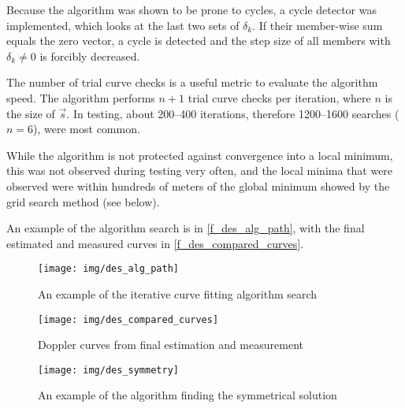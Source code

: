 Because the algorithm was shown to be prone to cycles, a cycle detector was implemented, which looks at the last two sets of $\delta_k$. If their member-wise sum equals the zero vector, a cycle is detected and the step size of all members with $\delta_k \not= 0$ is forcibly decreased.

The number of trial curve checks is a useful metric to evaluate the algorithm speed. The algorithm performs $n+1$ trial curve checks per iteration, where $n$ is the size of $\Vec{s}$. In testing, about \numrange{200}{400} iterations, therefore \numrange{1200}{1600} searches ($n = 6$), were most common.

While the algorithm is not protected against convergence into a local minimum, this was not observed during testing very often, and the local minima that were observed were within hundreds of meters of the global minimum showed by the grid search method (see below).

An example of the algorithm search is in \autoref{f_des_alg_path}, with the final estimated and measured curves in \autoref{f_des_compared_curves}.

\begin{figure}
    \centering
    \texttt{[image: img/des\_alg\_path]}
    \caption{An example of the iterative curve fitting algorithm search}
    \label{f_des_alg_path}
\end{figure}

\begin{figure}
    \centering
    \texttt{[image: img/des\_compared\_curves]}
    \caption{Doppler curves from final estimation and measurement}
    \label{f_des_compared_curves}
\end{figure}

\begin{figure}
    \centering
    \texttt{[image: img/des\_symmetry]}
    \caption{An example of the algorithm finding the symmetrical solution}
    \label{f_des_symmetry}
\end{figure}

